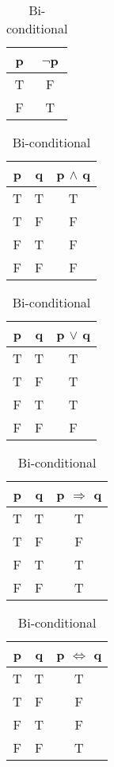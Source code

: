 \begin{table}[!htb]
	\centering
	\begin{minipage}{0.2\textwidth}
	\centering
		\begin{tabular}{|c |c|}
			\hline
			p &  $\lnot$p\\
			\hline
			T & F\\
			F & T\\
			\hline
		\end{tabular}
		\caption{\label{mod1:tab:Negation}Negation}
	\end{minipage}
	\begin{minipage}{0.38\textwidth}
		\centering
		\begin{tabular}{|c c|c|}
				\hline
				p & q & p $\land$ q\\
				\hline
				T & T & T\\
				T & F & F\\
				F & T & F\\
				F & F & F\\
				\hline
		\end{tabular}
		\caption{\label{mod1:tab:Conjunction}Conjunction}
	\end{minipage}
	\vspace{1cm}
	\begin{minipage}{0.38\textwidth}
	\centering
				\begin{tabular}{|c c|c|}
			\hline
			p & q & p $\lor$ q\\
			\hline
			T & T & T\\
			T & F & T\\
			F & T & T\\
			F & F & F\\
			\hline
		\end{tabular}
		\caption{\label{mod1:tab:Disjunction}Disjunction}
	\end{minipage}
	\hspace{6cm}
	\begin{minipage}{0.38\textwidth}
		\centering
		\begin{tabular}{|c c|c|}
			\hline
			p & q & p $\Rightarrow$ q\\
			\hline
			T & T & T\\
			T & F & F\\
			F & T & T\\
			F & F & T\\
			\hline
		\end{tabular}
		\caption{\label{mod1:tab:Conditional}Conditional}
	\end{minipage}
	\begin{minipage}{0.38\textwidth}
		\centering
		\begin{tabular}{|c c|c|}
			\hline
			p & q & p $\Leftrightarrow$ q\\
			\hline
			T & T & T\\
			T & F & F\\
			F & T & F\\
			F & F & T\\
			\hline
		\end{tabular}
		\caption{\label{mod1:tab:Bi-conditional}Bi-conditional}
	\end{minipage}
\end{table}


